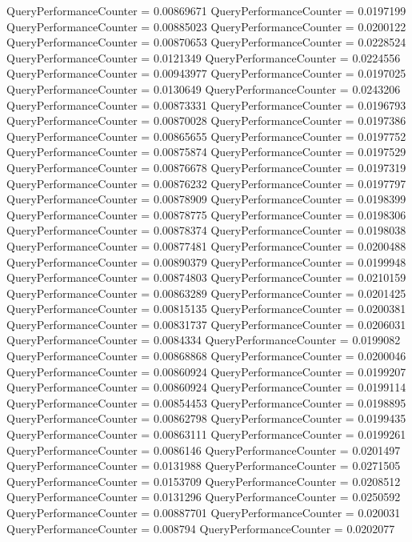 \documentclass[9pt]{article}
\theoremstyle{plain}
\theoremstyle{definition}
\theoremstyle{remark}
\numberwithin{equation}{section}
\begin{document}
QueryPerformanceCounter  =  0.00869671
QueryPerformanceCounter  =  0.0197199
QueryPerformanceCounter  =  0.00885023
QueryPerformanceCounter  =  0.0200122
QueryPerformanceCounter  =  0.00870653
QueryPerformanceCounter  =  0.0228524
QueryPerformanceCounter  =  0.0121349
QueryPerformanceCounter  =  0.0224556
QueryPerformanceCounter  =  0.00943977
QueryPerformanceCounter  =  0.0197025
QueryPerformanceCounter  =  0.0130649
QueryPerformanceCounter  =  0.0243206
QueryPerformanceCounter  =  0.00873331
QueryPerformanceCounter  =  0.0196793
QueryPerformanceCounter  =  0.00870028
QueryPerformanceCounter  =  0.0197386
QueryPerformanceCounter  =  0.00865655
QueryPerformanceCounter  =  0.0197752
QueryPerformanceCounter  =  0.00875874
QueryPerformanceCounter  =  0.0197529
QueryPerformanceCounter  =  0.00876678
QueryPerformanceCounter  =  0.0197319
QueryPerformanceCounter  =  0.00876232
QueryPerformanceCounter  =  0.0197797
QueryPerformanceCounter  =  0.00878909
QueryPerformanceCounter  =  0.0198399
QueryPerformanceCounter  =  0.00878775
QueryPerformanceCounter  =  0.0198306
QueryPerformanceCounter  =  0.00878374
QueryPerformanceCounter  =  0.0198038
QueryPerformanceCounter  =  0.00877481
QueryPerformanceCounter  =  0.0200488
QueryPerformanceCounter  =  0.00890379
QueryPerformanceCounter  =  0.0199948
QueryPerformanceCounter  =  0.00874803
QueryPerformanceCounter  =  0.0210159
QueryPerformanceCounter  =  0.00863289
QueryPerformanceCounter  =  0.0201425
QueryPerformanceCounter  =  0.00815135
QueryPerformanceCounter  =  0.0200381
QueryPerformanceCounter  =  0.00831737
QueryPerformanceCounter  =  0.0206031
QueryPerformanceCounter  =  0.0084334
QueryPerformanceCounter  =  0.0199082
QueryPerformanceCounter  =  0.00868868
QueryPerformanceCounter  =  0.0200046
QueryPerformanceCounter  =  0.00860924
QueryPerformanceCounter  =  0.0199207
QueryPerformanceCounter  =  0.00860924
QueryPerformanceCounter  =  0.0199114
QueryPerformanceCounter  =  0.00854453
QueryPerformanceCounter  =  0.0198895
QueryPerformanceCounter  =  0.00862798
QueryPerformanceCounter  =  0.0199435
QueryPerformanceCounter  =  0.00863111
QueryPerformanceCounter  =  0.0199261
QueryPerformanceCounter  =  0.0086146
QueryPerformanceCounter  =  0.0201497
QueryPerformanceCounter  =  0.0131988
QueryPerformanceCounter  =  0.0271505
QueryPerformanceCounter  =  0.0153709
QueryPerformanceCounter  =  0.0208512
QueryPerformanceCounter  =  0.0131296
QueryPerformanceCounter  =  0.0250592
QueryPerformanceCounter  =  0.00887701
QueryPerformanceCounter  =  0.020031
QueryPerformanceCounter  =  0.008794
QueryPerformanceCounter  =  0.0202077
\end{document}

